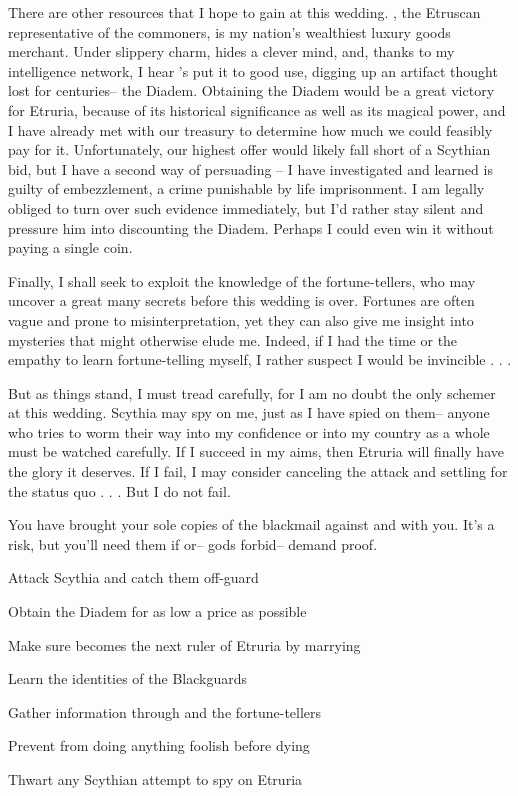 \documentclass[char]{Kos}
\begin{document}
There are other resources that I hope to gain at this wedding. \cMerchant{}, the Etruscan representative of the commoners, is my nation's wealthiest luxury goods merchant. Under \cMerchant{\their} slippery charm, \cMerchant{\they} hides a clever mind, and, thanks to my intelligence network, I hear \cMerchant{\they}'s put it to good use, digging up an artifact thought lost for centuries-- the Diadem. Obtaining the Diadem would be a great victory for Etruria, because of its historical significance as well as its magical power, and I have already met with our treasury to determine how much we could feasibly pay for it. Unfortunately, our highest offer would likely fall short of a Scythian bid, but I have a second way of persuading \cMerchant{}-- I have investigated \cMerchant{\them} and learned \cMerchant{\they} is guilty of embezzlement, a crime punishable by life imprisonment. I am legally obliged to turn over such evidence immediately, but I'd rather stay silent and pressure him into discounting the Diadem. Perhaps I could even win it without paying a single coin.

Finally, I shall seek to exploit the knowledge of the fortune-tellers, who may uncover a great many secrets before this wedding is over. Fortunes are often vague and prone to misinterpretation, yet they can also give me insight into mysteries that might otherwise elude me. Indeed, if I had the time or the empathy to learn fortune-telling myself, I rather suspect I would be invincible . . .

But as things stand, I must tread carefully, for I am no doubt the only schemer at this wedding. Scythia may spy on me, just as I have spied on them-- anyone who tries to worm their way into my confidence or into my country as a whole must be watched carefully. If I succeed in my aims, then Etruria will finally have the glory it deserves. If I fail, I may consider canceling the attack and settling for the status quo . . . But I do not fail.

\begin{itemz}[Notes]
  \item You have brought your sole copies of the blackmail against \cBride{} and \cMerchant{} with you. It's a risk, but you'll need them if \cMerchant{} or-- gods forbid-- \cBride{} demand proof.
\end{itemz}

\begin{itemz}[Goals]
 \item Attack Scythia and catch them off-guard
 \item Obtain the Diadem for as low a price as possible
 \item Make sure \cBride{} becomes the next ruler of Etruria by marrying \cGroom{}
 \item Learn the identities of the Blackguards
 \item Gather information through \cBride{} and the fortune-tellers
 \item Prevent \cPoet{} from doing anything foolish before dying
 \item Thwart any Scythian attempt to spy on Etruria
\end{itemz}
\end{document}
